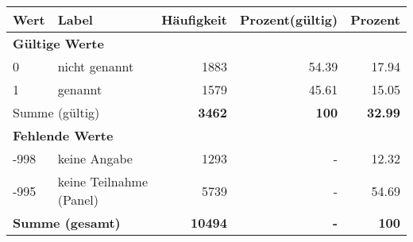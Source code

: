      \begin{longtable}{lXrrr}
     \toprule
     \textbf{Wert} & \textbf{Label} & \textbf{Häufigkeit} & \textbf{Prozent(gültig)} & \textbf{Prozent} \\
     \endhead
     \midrule
     \multicolumn{5}{l}{\textbf{Gültige Werte}}\\

     0 &
     \multicolumn{1}{X}{ nicht genannt   } &


       \num{1883} &
       \num[round-mode=places,round-precision=2]{54.39} &
         \num[round-mode=places,round-precision=2]{17.94} \\

     1 &
     \multicolumn{1}{X}{ genannt   } &


       \num{1579} &
       \num[round-mode=places,round-precision=2]{45.61} &
         \num[round-mode=places,round-precision=2]{15.05} \\
     \midrule
     \multicolumn{2}{l}{Summe (gültig)} &
       \textbf{\num{3462}} &
     \textbf{\num{100}} &
       \textbf{\num[round-mode=places,round-precision=2]{32.99}} \\
     \multicolumn{5}{l}{\textbf{Fehlende Werte}}\\
       -998 &
       keine Angabe &
         \num{1293} &
        - &
         \num[round-mode=places,round-precision=2]{12.32} \\
       -995 &
       keine Teilnahme (Panel) &
         \num{5739} &
        - &
         \num[round-mode=places,round-precision=2]{54.69} \\
     \midrule
     \multicolumn{2}{l}{\textbf{Summe (gesamt)}} &
          \textbf{\num{10494}} &
        \textbf{-} &
        \textbf{\num{100}} \\
     \bottomrule
     \end{longtable}
     
